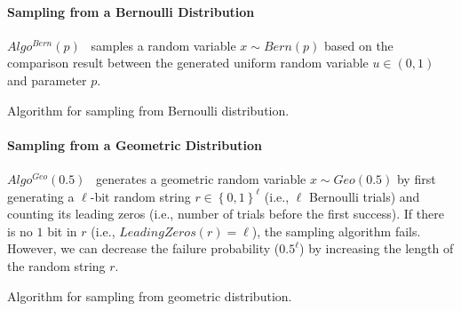 \paragraph{Sampling from a Bernoulli Distribution}
\label{SamplingfromaBernoulliDistribution}
$Algo^{Bern}\left(p\right)$~\cite{knott2021crypten} samples a random variable $x\sim Bern\left(p\right) $ based on the comparison result between the generated uniform random variable $u \in \left(0,1\right) $ and parameter $p$.

\begin{algorithm}[tbh!]
    \centering
    \caption{Algorithm for sampling from Bernoulli distribution.}
    \label{algo:Bernoulli}
\end{algorithm}
\FloatBarrier

\paragraph{Sampling from a Geometric Distribution}
$Algo^{Geo}\left(0.5\right)$~\cite{walker1974fast, googleDP2019} generates a geometric random variable $x\sim Geo\left(0.5\right) $ by first generating a $\ell$-bit random string $r\in \left\{0,1\right\}^\ell $ (i.e., $\ell$ Bernoulli trials) and counting its leading zeros (i.e., number of trials before the first success). If there is no $1$ bit in $r$ (i.e., $ LeadingZeros(r)=\ell$), the sampling algorithm fails. However, we can decrease the failure probability ($0.5^{\ell}$) by increasing the length of the random string $r$.

\begin{algorithm}[tbh!]
    \centering
    \caption{Algorithm for sampling from geometric distribution.}
    \label{algo:Geometric}
\end{algorithm}
\FloatBarrier

